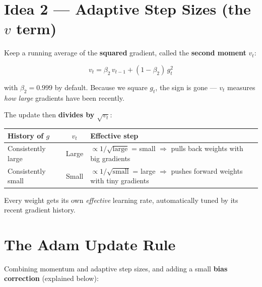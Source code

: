 \documentclass[12pt, a4paper]{article}
\begin{document}
\section{Idea 2 --- Adaptive Step Sizes (the $v$ term)}

Keep a running average of the \textbf{squared} gradient, called the
\textbf{second moment} $v_t$:

\[
  v_t = \beta_2 \, v_{t-1} + (1 - \beta_2)\, g_t^2
\]

with $\beta_2 = 0.999$ by default.
Because we square $g_t$, the sign is gone --- $v_t$ measures
\emph{how large} gradients have been recently.

The update then \textbf{divides by $\sqrt{v_t}$}:

\begin{center}
  \renewcommand{\arraystretch}{1.3}
  \begin{tabular}{lcp{6cm}}
    \toprule
    History of $g$     & $v_t$ & Effective step                          \\
    \midrule
    Consistently large & Large & $\propto 1/\sqrt{\text{large}}$ = small
    $\Rightarrow$ pulls back weights with big gradients                  \\
    Consistently small & Small & $\propto 1/\sqrt{\text{small}}$ = large
    $\Rightarrow$ pushes forward weights with tiny gradients             \\
    \bottomrule
  \end{tabular}
\end{center}

Every weight gets its own \emph{effective} learning rate, automatically tuned
by its recent gradient history.

\section{The Adam Update Rule}

Combining momentum and adaptive step sizes, and adding a small
\textbf{bias correction} (explained below):
\end{document}
